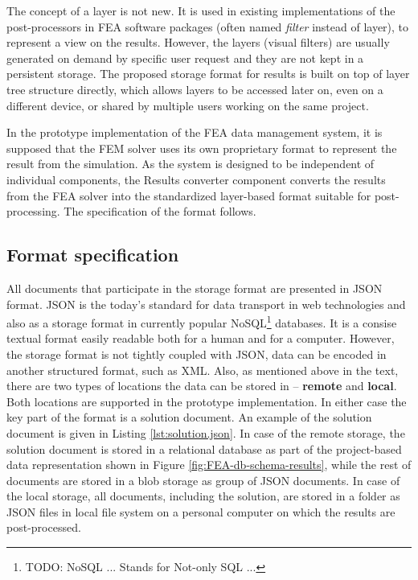 The concept of a layer is not new. It is used in existing implementations of the post-processors in FEA software packages (often named \textit{filter} instead of layer), to represent a view on the results. However, the layers (visual filters) are usually generated on demand by specific user request and they are not kept in a persistent storage. The proposed storage format for results is built on top of layer tree structure directly, which allows layers to be accessed later on, even on a different device, or shared by multiple users working on the same project.

In the prototype implementation of the FEA data management system, it is supposed that the FEM solver uses its own proprietary format to represent the result from the simulation. As the system is designed to be independent of individual components, the Results converter component converts the results from the FEA solver into the standardized layer-based format suitable for post-processing. The specification of the format follows.

\subsection{Format specification}

All documents that participate in the storage format are presented in JSON format. JSON is the today's standard for data transport in web technologies and also as a storage format in currently popular NoSQL\footnote{TODO: NoSQL ... Stands for Not-only SQL ...} databases. It is a consise textual format easily readable both for a human and for a computer. However, the storage format is not tightly coupled with JSON, data can be encoded in another structured format, such as XML. Also, as mentioned above in the text, there are two types of locations the data can be stored in -- \textbf{remote} and \textbf{local}. Both locations are supported in the prototype implementation. In either case the key part of the format is a solution document. An example of the solution document is given in Listing \ref{lst:solution.json}. In case of the remote storage, the solution document is stored in a relational database as part of the project-based data representation shown in Figure \ref{fig:FEA-db-schema-results}, while the rest of documents are stored in a blob storage as group of JSON documents. In case of the local storage, all documents, including the solution, are stored in a folder as JSON files in local file system on a personal computer on which the results are post-processed.

